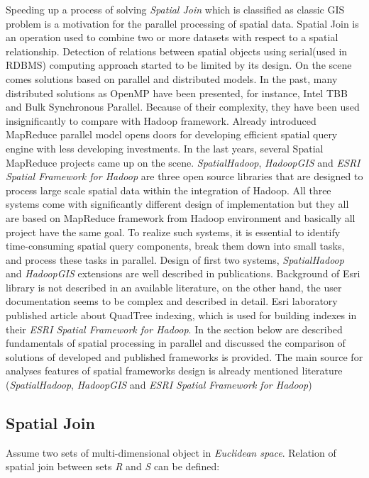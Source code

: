 \documentclass[a4paper,12pt,oneside]{report}
\begin{document}
	Speeding up a process of solving \textit{Spatial Join} which is classified as
	classic GIS 
	problem is a motivation for the parallel processing of spatial data. Spatial
	Join 
	is an operation used to combine two or more datasets with respect to a spatial 
	relationship. Detection of relations between spatial objects using serial(used
	in RDBMS) 
	computing approach started to be limited by its design. On the scene comes
	solutions
	based on parallel and distributed models. In the past, many distributed 
	solutions as OpenMP\cite{omp} have been presented, for instance, Intel TBB and
	Bulk Synchronous Parallel\cite{multi_cpu}.
	Because of their complexity, they have been used insignificantly to compare with
	Hadoop framework.
	Already introduced MapReduce parallel model opens doors for developing efficient
	spatial query engine with less developing investments. In the last years,
	several Spatial MapReduce projects came up on the scene.
	\textit{SpatialHadoop}\cite{spatialhadoop}, \textit{HadoopGIS}\cite{hadoopGIS}
	and \textit{ESRI Spatial Framework for Hadoop}\cite{esri_framework}
	are three open source libraries that are designed to process large scale spatial
	data within the integration of Hadoop.
	All three systems come with significantly different design of implementation but
	they all are based
	on MapReduce framework from Hadoop environment and basically all project have
	the same goal.
	To realize such systems, it is essential to identify time-consuming spatial
	query components,
	break them down into small tasks, and process these tasks in parallel. 
	Design of first two systems, \textit{SpatialHadoop} and \textit{HadoopGIS}
	extensions are well described in publications. Background of Esri library is not
	described in an available
	literature, on the other hand, the user documentation seems to be complex and
	described in detail. 
	Esri laboratory published article\cite{esri_indexing} about QuadTree indexing,
	which is used for building 
	indexes in their \textit{ESRI Spatial Framework for Hadoop}.
	In the section below are described fundamentals of spatial processing in
	parallel and  discussed 
	the comparison of solutions of developed and published frameworks is provided.
	The main source for  analyses features of spatial frameworks design is already
	mentioned literature (\textit{SpatialHadoop}\cite{spatialhadoop},
	\textit{HadoopGIS}\cite{hadoopGIS} 
	and \textit{ESRI Spatial Framework for Hadoop}\cite{esri_framework})
	
	
	\subsection{Spatial Join}
	\label{sub:spatial_join}
	Assume two sets of multi-dimensional object in \emph{Euclidean space}. Relation
	of spatial 
	join between sets \emph{R} and \emph{S} can be defined\cite{spatial_join2}:
	
\end{document}
